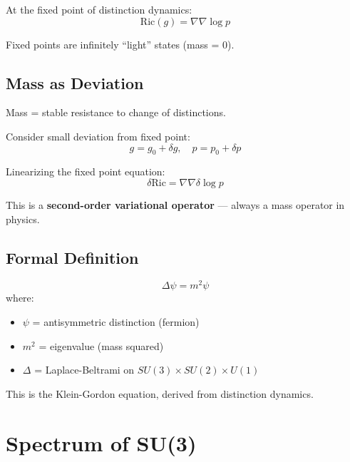 At the fixed point of distinction dynamics:
\begin{equation}
\mathrm{Ric}(g) = \nabla\nabla\log p
\end{equation}

Fixed points are infinitely ``light'' states (mass = 0).

\subsection{Mass as Deviation}

\begin{definition}[Mass]
Mass = stable resistance to change of distinctions.
\end{definition}

Consider small deviation from fixed point:
\begin{equation}
g = g_0 + \delta g, \quad p = p_0 + \delta p
\end{equation}

Linearizing the fixed point equation:
\begin{equation}
\delta\mathrm{Ric} = \nabla\nabla\delta\log p
\end{equation}

This is a \textbf{second-order variational operator} — always a mass operator in physics.

\subsection{Formal Definition}

\begin{theorem}
\begin{equation}
\boxed{\Delta\psi = m^2\psi}
\end{equation}
where:
\begin{itemize}
    \item $\psi$ = antisymmetric distinction (fermion)
    \item $m^2$ = eigenvalue (mass squared)
    \item $\Delta$ = Laplace-Beltrami on $SU(3) \times SU(2) \times U(1)$
\end{itemize}
\end{theorem}

This is the Klein-Gordon equation, derived from distinction dynamics.

\section{Spectrum of SU(3)}

